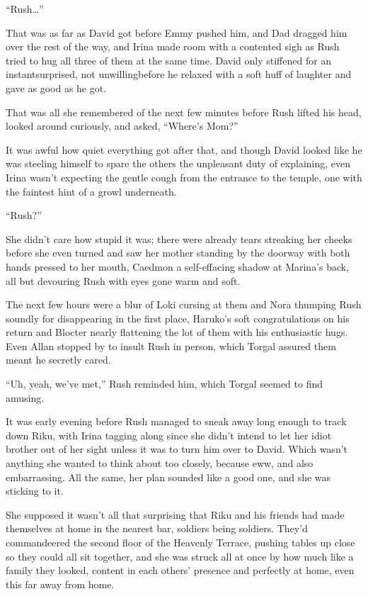 ``Rush\ldots''

That was as far as David got before Emmy pushed him, and Dad dragged him over the rest of the way, and Irina made room with a contented sigh as Rush tried to hug all three of them at the same time. David only stiffened for an instant\textemdash surprised, not unwilling\textemdash before he relaxed with a soft huff of laughter and gave as good as he got.

That was all she remembered of the next few minutes before Rush lifted his head, looked around curiously, and asked, ``Where's Mom?''

It was awful how quiet everything got after that, and though David looked like he was steeling himself to spare the others the unpleasant duty of explaining, even Irina wasn't expecting the gentle cough from the entrance to the temple, one with the faintest hint of a growl underneath.

``Rush?''

She didn't care how stupid it was; there were already tears streaking her cheeks before she even turned and saw her mother standing by the doorway with both hands pressed to her mouth, Caedmon a self-effacing shadow at Marina's back, all but devouring Rush with eyes gone warm and soft.

The next few hours were a blur of Loki cursing at them and Nora thumping Rush soundly for disappearing in the first place, Haruko's soft congratulations on his return and Blocter nearly flattening the lot of them with his enthusiastic hugs. Even Allan stopped by to insult Rush in person, which Torgal assured them meant he secretly cared.

``Uh, yeah, we've met,'' Rush reminded him, which Torgal seemed to find amusing.

It was early evening before Rush managed to sneak away long enough to track down Riku, with Irina tagging along since she didn't intend to let her idiot brother out of her sight unless it was to turn him over to David. Which wasn't anything she wanted to think about too closely, because eww, and also embarrassing. All the same, her plan sounded like a good one, and she was sticking to it.

She supposed it wasn't all that surprising that Riku and his friends had made themselves at home in the nearest bar, soldiers being soldiers. They'd commandeered the second floor of the Heavenly Terrace, pushing tables up close so they could all sit together, and she was struck all at once by how much like a family they looked, content in each others' presence and perfectly at home, even this far away from home.

